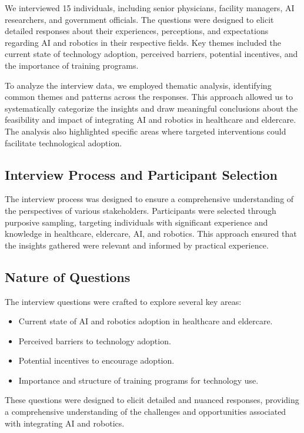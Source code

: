 \documentclass{article} %
\begin{document}
We interviewed 15 individuals, including senior physicians, facility managers, AI researchers, and government officials. The questions were designed to elicit detailed responses about their experiences, perceptions, and expectations regarding AI and robotics in their respective fields. Key themes included the current state of technology adoption, perceived barriers, potential incentives, and the importance of training programs.

To analyze the interview data, we employed thematic analysis, identifying common themes and patterns across the responses. This approach allowed us to systematically categorize the insights and draw meaningful conclusions about the feasibility and impact of integrating AI and robotics in healthcare and eldercare. The analysis also highlighted specific areas where targeted interventions could facilitate technological adoption.

\subsection{Interview Process and Participant Selection}

The interview process was designed to ensure a comprehensive understanding of the perspectives of various stakeholders. Participants were selected through purposive sampling, targeting individuals with significant experience and knowledge in healthcare, eldercare, AI, and robotics. This approach ensured that the insights gathered were relevant and informed by practical experience.

\subsection{Nature of Questions}

The interview questions were crafted to explore several key areas:
\begin{itemize}
    \item Current state of AI and robotics adoption in healthcare and eldercare.
    \item Perceived barriers to technology adoption.
    \item Potential incentives to encourage adoption.
    \item Importance and structure of training programs for technology use.
\end{itemize}
These questions were designed to elicit detailed and nuanced responses, providing a comprehensive understanding of the challenges and opportunities associated with integrating AI and robotics.
\end{document}
